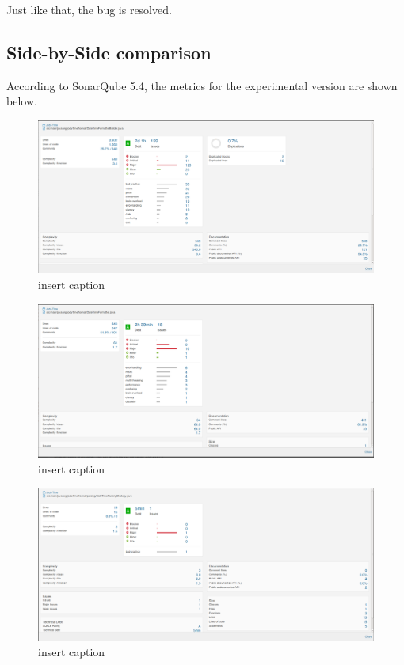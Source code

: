 Just like that, the bug is resolved.
 
\subsection{Side-by-Side comparison}

According to SonarQube 5.4, the metrics for the experimental version are shown below.

\begin{figure}[H]
	\centering
	\includegraphics[width=\linewidth]{metric1}
	\caption{insert caption}
\end{figure}
\begin{figure}[H]
	\centering
	\includegraphics[width=\linewidth]{metric2}
	\caption{insert caption}
\end{figure}
\begin{figure}[H]
	\centering
	\includegraphics[width=\linewidth]{metric3}
	\caption{insert caption}
\end{figure}
